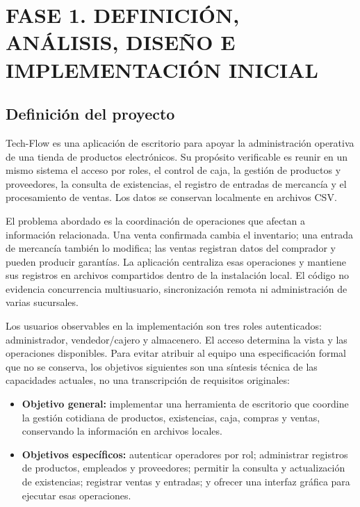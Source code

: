 \section{FASE 1. DEFINICIÓN, ANÁLISIS, DISEÑO E IMPLEMENTACIÓN INICIAL}

\subsection{Definición del proyecto}
\label{subsec:definicion}

Tech-Flow es una aplicación de escritorio para apoyar la administración operativa de una tienda de productos electrónicos. Su propósito verificable es reunir en un mismo sistema el acceso por roles, el control de caja, la gestión de productos y proveedores, la consulta de existencias, el registro de entradas de mercancía y el procesamiento de ventas. Los datos se conservan localmente en archivos CSV.

El problema abordado es la coordinación de operaciones que afectan a información relacionada. Una venta confirmada cambia el inventario; una entrada de mercancía también lo modifica; las ventas registran datos del comprador y pueden producir garantías. La aplicación centraliza esas operaciones y mantiene sus registros en archivos compartidos dentro de la instalación local. El código no evidencia concurrencia multiusuario, sincronización remota ni administración de varias sucursales.

Los usuarios observables en la implementación son tres roles autenticados: administrador, vendedor/cajero y almacenero. El acceso determina la vista y las operaciones disponibles. Para evitar atribuir al equipo una especificación formal que no se conserva, los objetivos siguientes son una síntesis técnica de las capacidades actuales, no una transcripción de requisitos originales:

\begin{itemize}
    \item \textbf{Objetivo general:} implementar una herramienta de escritorio que coordine la gestión cotidiana de productos, existencias, caja, compras y ventas, conservando la información en archivos locales.
    \item \textbf{Objetivos específicos:} autenticar operadores por rol; administrar registros de productos, empleados y proveedores; permitir la consulta y actualización de existencias; registrar ventas y entradas; y ofrecer una interfaz gráfica para ejecutar esas operaciones.
\end{itemize}

